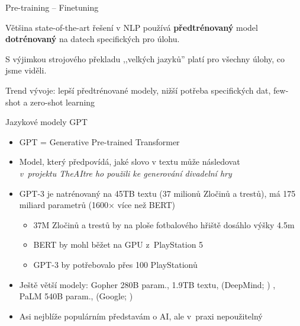 \documentclass[handout,aspectratio=169,dvipsnames]{beamer}
\begin{document}
\begin{frame}{Pre-training -- Finetuning}

    \centering

    {\huge
		Většina state-of-the-art řešení v NLP používá \textbf{předtrénovaný} model
		\textbf{dotrénovaný} na datech specifických pro úlohu.}

    \vspace{30pt}

    S výjimkou strojového překladu ,,velkých jazyků'' platí pro všechny úlohy,
    co jsme viděli.

    \vspace{10pt}

	Trend vývoje: lepší předtrénované modely, nižší potřeba specifických dat,
		few-shot a zero-shot learning

\end{frame}


\begin{frame}{Jazykové modely GPT}

    \begin{itemize}[<+->]

        \item GPT = Generative Pre-trained Transformer

        \item Model, který předpovídá, jaké slovo v textu může následovat \\
            \it v~projektu TheAItre ho použili ke generování divadelní hry

        \item GPT-3 je natrénovaný na 45TB textu (37 milionů Zločinů a trestů),
            má 175 miliard parametrů (1600$\times$ více než BERT)

            \begin{itemize}[<+->]

                \item 37M Zločinů a trestů by na ploše fotbalového hřiště
                    dosáhlo výšky 4.5m

                \item BERT by mohl běžet na GPU z~PlayStation 5

                \item GPT-3 by potřebovalo přes 100 PlayStationů

            \end{itemize}

	\item Ještě větší modely: Gopher 280B param., 1.9TB textu,  {\small (DeepMind; \citealp{deepmind2021gopher})} , \\ \quad  PaLM 540B param.,  {\small (Google;  \citealp{google2022palm})}

            \item Asi nejblíže populárním představám o AI, ale v~praxi nepoužitelný

    \end{itemize}

\end{frame}
\end{document}
